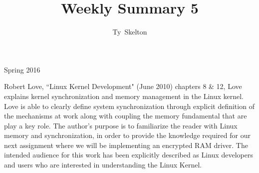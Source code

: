 \documentclass[10pt,draftclsnofoot,onecolumn]{IEEEtran}
\begin{document}
\singlespacing
\title{Weekly Summary 5}

\author{Ty~Skelton}

{Spring 2016}

\maketitle
\IEEEpeerreviewmaketitle

Robert Love, ``Linux Kernel Development" (June 2010) chapters 8 \& 12, Love explains kernel synchronization and memory management in the Linux kernel.
Love is able to clearly define system synchronization through explicit definition of the mechanisms at work along with coupling the memory fundamental that are play a key role.
The author's purpose is to familiarize the reader with Linux memory and synchronization, in order to provide the knowledge required for our next assignment where we will be implementing an encrypted RAM driver. 
The intended audience for this work has been explicitly described as Linux developers and users who are interested in understanding the Linux Kernel.
\end{document}
